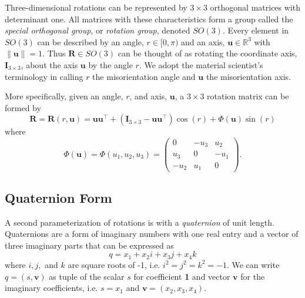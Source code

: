 Three-dimensional rotations can be represented by $3\times3$ orthogonal matrices with determinant one.  All matrices with these characteristics form a group called the {\it special orthogonal group}, or {\it rotation group}, denoted $SO(3)$.  Every element in $SO(3)$ can be described by an angle, $r\in[0,\pi)$ and an axis, $\bm u\in\mathbb{R}^3$ with $\|\bm u\|=1$. Thus $\bm{R}\in SO(3)$ can be thought of as rotating the coordinate axis, $\bm{I}_{3 \times 3}$, about the axis $\bm{u}$ by the angle $r$.  We adopt the material scientist's terminology in calling $r$ the misorientation angle and $\bm u$ the misorientation axis.

More specifically, given an angle, $r$, and axis, $\bm u$, a $3\times 3$ rotation matrix can be formed by
\begin{equation}\label{eqn:angleaxis}
 \bm{R} = \bm{R}(r,\bm{u}) = \bm{u}\bm{u}^\top+(\bm{I}_{3\times3}-\bm{u}\bm{u}^\top)\cos(r) +\Phi(\bm{u})\sin(r)
\end{equation}
where
\[
\Phi(\bm{u}) = \Phi (u_1,u_2,u_3) = \left(\begin{array}{ccc}0 & -u_3 & u_2 \\ u_3 & 0 & -u_1 \\-u_2 & u_1 & 0\end{array}\right).
\]



\subsection{Quaternion Form}

A second parameterization of rotations is with a {\it quaternion} of unit length.  Quaternions are a form of imaginary numbers with one real entry and a vector of three imaginary parts that can be expressed as
\[
q = x_1 + x_2 i + x_3 j + x_4 k
\]
where $i,j,$ and $k$ are square roots of -1, i.e. $i^2 = j^2= k^2 = -1$.  We can write $q=(s,\bm v)$ as tuple of the scalar $s$ for coefficient {\bf 1} and vector $\bm v$ for the imaginary coefficients, i.e. $s=x_1$ and $\bm v= (x_2, x_3, x_4)$.

